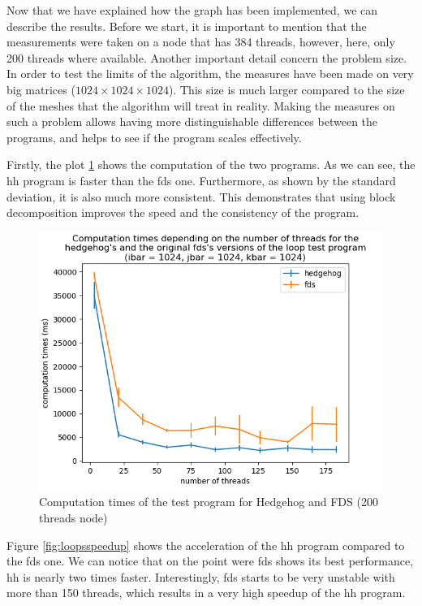 Now that we have explained how the graph has been implemented, we can describe
the results. Before we start, it is important to mention that the measurements
were taken on a node that has 384 threads, however, here, only 200 threads where
available. Another important detail concern the problem size. In order to test
the limits of the algorithm, the measures have been made on very big matrices
($1024\times1024\times1024$). This size is much larger compared to the size of
the meshes that the algorithm will treat in reality. Making the measures on such
a problem allows having more distinguishable differences between the programs,
and helps to see if the program scales effectively.

Firstly, the plot \ref{fig:loopscomptime} shows the computation of the two
programs. As we can see, the \gls{hh} program is faster than the \gls{fds} one.
Furthermore, as shown by the standard deviation, it is also much more
consistent. This demonstrates that using block decomposition improves the speed
and the consistency of the program. \clearpage{}

\begin{figure}[ht!]
  \begin{center}
    \includegraphics[scale=0.6]{img/fds-loops/times.png}
    \caption{Computation times of the test program for Hedgehog and FDS (200 threads node)}
    \label{fig:loopscomptime}
  \end{center}
\end{figure}

Figure \ref{fig:loopsspeedup} shows the acceleration of the
\gls{hh} program compared to the \gls{fds} one. We can notice that on the point
were \gls{fds} shows its best performance, \gls{hh} is nearly two times faster.
Interestingly, \gls{fds} starts to be very unstable with more than 150 threads,
which results in a very high speedup of the \gls{hh} program.

